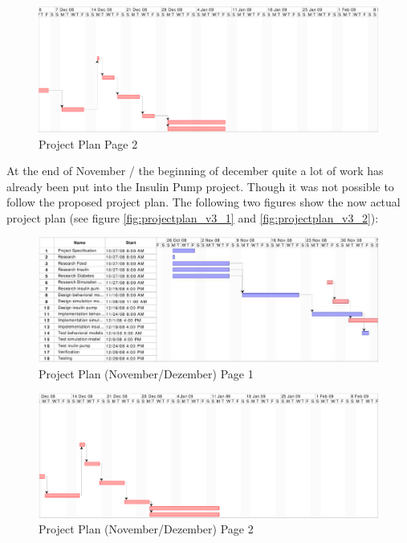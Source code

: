 \begin{figure}[htb]
\centering
\includegraphics[width=\textwidth]{images/projectplan_page2}
\caption{Project Plan Page 2}
\label{fig:projectplan2}
\end{figure}

\newpage
At the end of November / the beginning of december quite a lot of work has
already been put into the Insulin Pump project.
Though it was not possible to follow the proposed project plan.
The following two figures show the now actual project plan (see figure
\vref{fig:projectplan_v3_1} and \vref{fig:projectplan_v3_2}):

\begin{figure}[htb]
\centering
\includegraphics[width=\textwidth]{images/projectplan_v3_page1}
\caption{Project Plan (November/Dezember) Page 1}
\label{fig:projectplan_v3_1}
\end{figure}

\begin{figure}[htb]
\centering
\includegraphics[width=\textwidth]{images/projectplan_v3_page2}
\caption{Project Plan (November/Dezember) Page 2}
\label{fig:projectplan_v3_2}
\end{figure}

